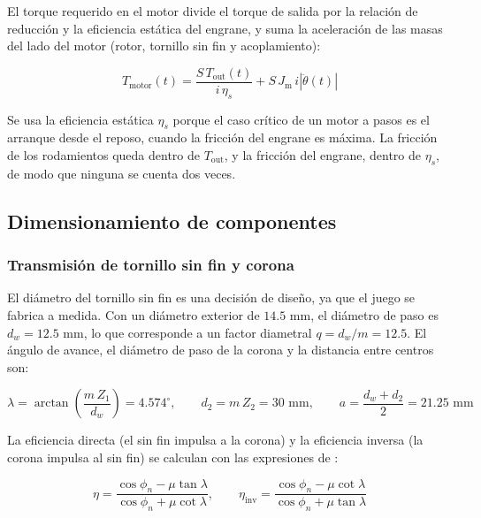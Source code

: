 \documentclass[../../General.tex]{subfiles}
\begin{document}
El torque requerido en el motor divide el torque de salida por la relación de reducción y la eficiencia estática del engrane, y suma la aceleración de las masas del lado del motor (rotor, tornillo sin fin y acoplamiento):

\begin{equation}\label{eq:Tmotor_tilt}
    T_{\text{motor}}(t) = \frac{S\, T_{\text{out}}(t)}{i\, \eta_s} + S\, J_{\text{m}}\, i \left|\ddot{\theta}(t)\right|
\end{equation}

Se usa la eficiencia estática $\eta_s$ porque el caso crítico de un motor a pasos es el arranque desde el reposo, cuando la fricción del engrane es máxima. La fricción de los rodamientos queda dentro de $T_{\text{out}}$, y la fricción del engrane, dentro de $\eta_s$, de modo que ninguna se cuenta dos veces.

\subsection{Dimensionamiento de componentes}

\subsubsection{Transmisión de tornillo sin fin y corona}

El diámetro del tornillo sin fin es una decisión de diseño, ya que el juego se fabrica a medida. Con un diámetro exterior de $14.5\text{ mm}$, el diámetro de paso es $d_w = 12.5\text{ mm}$, lo que corresponde a un factor diametral $q = d_w/m = 12.5$. El ángulo de avance, el diámetro de paso de la corona y la distancia entre centros son:

\begin{equation}\label{eq:geom_sinfin}
    \lambda = \arctan\!\left(\frac{m\, Z_1}{d_w}\right) = 4.574^\circ, \qquad d_2 = m\, Z_2 = 30\text{ mm}, \qquad a = \frac{d_w + d_2}{2} = 21.25\text{ mm}
\end{equation}

La eficiencia directa (el sin fin impulsa a la corona) y la eficiencia inversa (la corona impulsa al sin fin) se calculan con las expresiones de \citet{shigley2012mecanico}:

\begin{equation}\label{eq:eta_sinfin}
    \eta = \frac{\cos\phi_n - \mu \tan\lambda}{\cos\phi_n + \mu \cot\lambda}, \qquad
    \eta_{\text{inv}} = \frac{\cos\phi_n - \mu \cot\lambda}{\cos\phi_n + \mu \tan\lambda}
\end{equation}
\end{document}
